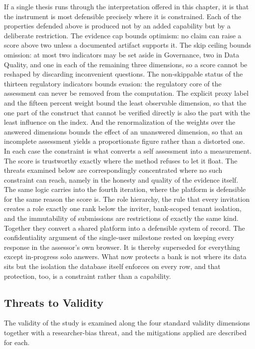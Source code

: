 If a single thesis runs through the interpretation offered in this chapter, it is that the instrument is most defensible precisely where it is constrained. Each of the properties defended above is produced not by an added capability but by a deliberate restriction. The evidence cap bounds optimism: no claim can raise a score above two unless a documented artifact supports it. The skip ceiling bounds omission: at most two indicators may be set aside in Governance, two in Data Quality, and one in each of the remaining three dimensions, so a score cannot be reshaped by discarding inconvenient questions. The non-skippable status of the thirteen regulatory indicators bounds evasion: the regulatory core of the assessment can never be removed from the computation. The explicit proxy label and the fifteen percent weight bound the least observable dimension, so that the one part of the construct that cannot be verified directly is also the part with the least influence on the index. And the renormalization of the weights over the answered dimensions bounds the effect of an unanswered dimension, so that an incomplete assessment yields a proportionate figure rather than a distorted one. In each case the constraint is what converts a self assessment into a measurement. The score is trustworthy exactly where the method refuses to let it float. The threats examined below are correspondingly concentrated where no such constraint can reach, namely in the honesty and quality of the evidence itself. The same logic carries into the fourth iteration, where the platform is defensible for the same reason the score is. The role hierarchy, the rule that every invitation creates a role exactly one rank below the inviter, bank-scoped tenant isolation, and the immutability of submissions are restrictions of exactly the same kind. Together they convert a shared platform into a defensible system of record. The confidentiality argument of the single-user milestone rested on keeping every response in the assessor's own browser. It is thereby superseded for everything except in-progress solo answers. What now protects a bank is not where its data sits but the isolation the database itself enforces on every row, and that protection, too, is a constraint rather than a capability.

\subsection{Threats to Validity}

The validity of the study is examined along the four standard validity dimensions together with a researcher-bias threat, and the mitigations applied are described for each.

